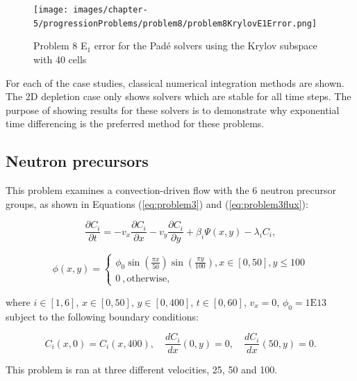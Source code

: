 \clearpage

\begin{figure}[p]
    \centering
    \texttt{[image: images/chapter-5/progressionProblems/problem8/problem8KrylovE1Error.png]}
    \caption{Problem 8 E${}_{1}$ error for the Pad\'e solvers using the Krylov subspace with 40 cells}
    \label{fig:problem8_E1_error_krylov}
\end{figure}

\clearpage

For each of the case studies, classical numerical integration methods are shown. The 2D depletion case only shows solvers which are stable for all time steps. The purpose of showing results for these solvers is to demonstrate why exponential time differencing is the preferred method for these problems.  

\subsection{Neutron precursors}
This problem examines a convection-driven flow with the 6 neutron precursor groups, as shown in Equations (\ref{eq:problem3}) and (\ref{eq:problem3flux}): 

\begin{equation}
\frac{\partial C_{i}}{\partial t} = -v_{x}\frac{\partial C_{i}}{\partial x} - v_{y}\frac{\partial C_{i}}{\partial y} + \beta_{i} \Psi (x, y) -\lambda_i C_{i},
\label{eq:problem3}
\end{equation}

\begin{equation}
\phi (x, y) = \begin{cases}
  \phi _0 \sin\left(\frac{\pi x}{50}\right)\sin\left(\frac{\pi y}{100}\right) , x \in [0,50], y \le 100 \\
  0\ , \text{otherwise},
  \label{eq:problem3flux}
\end{cases}
\end{equation}

\noindent where $i \in [1,6]$, $x \in [0, 50]$, $y \in [0, 400]$, $t \in [0, 60]$, $v_{x} = 0$, $\phi_0 = 1\text{E}13$ subject to the following boundary conditions:

\begin{equation}
    C_{i}(x,0) = C_{i}(x,400), \quad \frac{dC_{i}}{dx}(0,y) = 0, \quad \frac{dC_{i}}{dx}(50, y) = 0.
\end{equation}

\noindent This problem is ran at three different velocities, 25, 50 and 100. 

